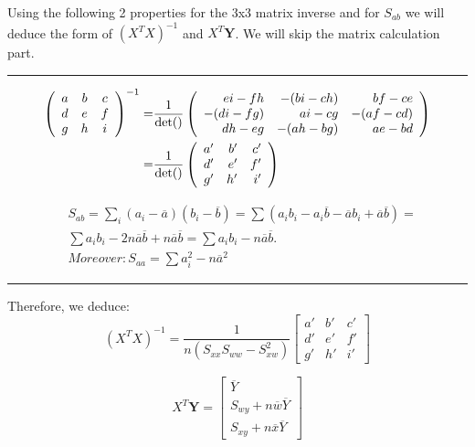 \documentclass[a4paper]{article}
\begin{document}
Using the following 2 properties for the 3x3 matrix inverse and for $S_{ab}$ we will deduce the form of $(X^{T}X)^{-1}$ and $X^{T}\textbf{Y}$. We will skip the matrix calculation part.
\vspace{2.5mm}
\hrule
\begin{equation}
\begin{split}
\left(\begin{array}{ccc}
a&b&c\\
d&e&f\\
g&h&i
\end{array}\right)^{-1}
=&
{1 \over {\rm{det()}}}
\left(\begin{array}{rrr}
e i - f h&-(b i - c h)&b f - c e\\
-(d i - f g)&a i - c g&-(a f -c d)\\
d h - e g&-(a h - b g)&a e - b d
\end{array}\right)\\
=&
{1 \over {\rm{det()}}}
\left(\begin{array}{rrr}
a' & b' & c'\\
d' & e' & f'\\
g' & h' & i'
\end{array}\right)
\end{split}
\end{equation}

\begin{equation}
\begin{split}
& S_{ab} = \sum_{i}{(a_{i}-\overline{a})(b_{i}-\overline{b})} = \sum{(a_{i}b_{i} - a_{i}\overline{b}-\overline{a}b_{i} + \overline{a}\overline{b})} = \\ 
& \sum{a_{i}b_{i}} - 2n\overline{a}\overline{b} + n\overline{a}\overline{b} = \sum{a_{i}b_{i}} - n\overline{a}\overline{b}. \\ 
& Moreover: S_{aa} = \sum{a_{i}^2} - n\overline{a}^2
\end{split}
\end{equation}
\hrule
\vspace{2.5mm}
Therefore, we deduce:
\begin{equation*}
(X^{T}X)^{-1} = \frac{1}{n(S_{xx}S_{ww}-S_{xw}^2)}
	\begin{bmatrix}
	a' & b' & c'\\
	d' & e' & f'\\
	g' & h' & i'
	\end{bmatrix}
\end{equation*}

\begin{equation*}
X^{T}\textbf{Y} = 
	\begin{bmatrix}
	\overline{Y} \\
	S_{wy} + n\overline{w}\overline{Y} \\
	S_{xy} + n\overline{x}\overline{Y}
	\end{bmatrix} 
\end{equation*}
\end{document}
